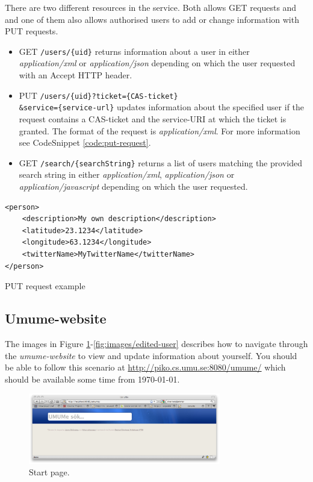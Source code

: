 \documentclass[titlepage, twocolumn, a4paper, 10pt]{article}
\begin{document}
There are two different resources in the service. Both allows GET
requests and and one of them also allows authorised users to add or
change information with PUT requests.
\begin{itemize}
\item GET \verb!/users/{uid}! returns information about a user in
  either \textit{application/xml} or \textit{application/json}
  depending on which the user requested with an Accept HTTP header.
\item PUT
  \texttt{/users/\{uid\}?ticket=\{CAS-ticket\}\\\&service=\{service-url\}}
  updates information about the specified user if the request contains
  a CAS-ticket and the service-URI at which the ticket is granted. The
  format of the request is \textit{application/xml}. For more
  information see CodeSnippet \ref{code:put-request}.
\item GET \verb!/search/{searchString}! returns a list of users
  matching the provided search string in either
  \textit{application/xml}, \textit{application/json} or
  \textit{application/javascript} depending on which the user
  requested.
\end{itemize}

\begin{code}
  \begin{footnotesize}
\begin{verbatim}
<person>
    <description>My own description</description>
    <latitude>23.1234</latitude>
    <longitude>63.1234</longitude>
    <twitterName>MyTwitterName</twitterName>
</person>
\end{verbatim}
  \end{footnotesize}
  \caption{PUT request example}\label{code:put-request}
\end{code}

\subsection{Umume-website}

The images in Figure
\ref{fig:images/startpage}-\vref{fig:images/edited-user} describes how
to navigate through the \textit{umume-website} to view and update
information about yourself. You should be able to follow this scenario
at \url{http://piko.cs.umu.se:8080/umume/} which should be available
some time from \today.
\newpage
\begin{figure}[H]
  \centering
  \includegraphics[width=3.3in]{images/pic1.png}
  \caption{Start page.}
  \label{fig:images/startpage}
\end{figure}
\end{document}
